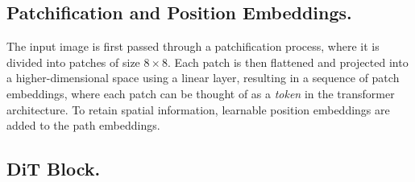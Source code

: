 \documentclass[10pt]{article}
\theoremstyle{plain}
\begin{document}
\subsection{Patchification and Position Embeddings.}

The input image is first passed through a patchification process, where it is divided into patches of size \(8 \times 8\). Each patch is then flattened and projected into a higher-dimensional space using a linear layer, resulting in a sequence of patch embeddings, where each patch can be thought of as a \emph{token} in the transformer architecture. To retain spatial information, learnable position embeddings are added to the path embeddings.  

\subsection{DiT Block.}
\end{document}

